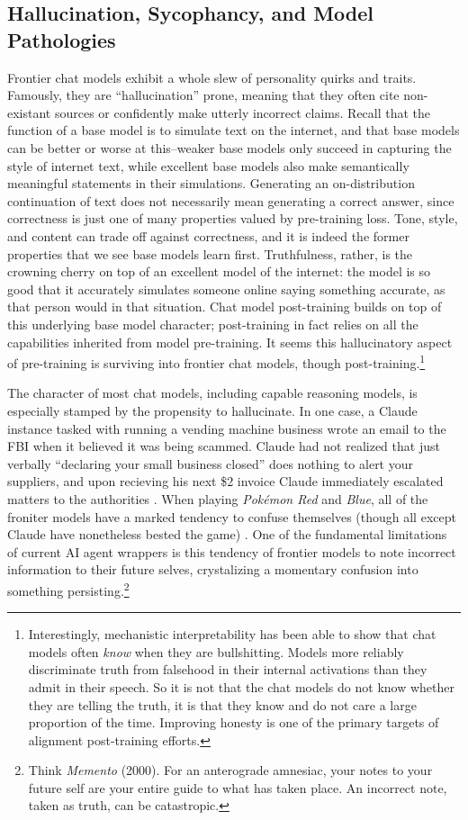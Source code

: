 \subsection{Hallucination, Sycophancy, and Model Pathologies}
Frontier chat models exhibit a whole slew of personality quirks and traits.
Famously, they are ``hallucination'' prone, meaning that they often cite
non-existant sources or confidently make utterly incorrect claims. Recall that
the function of a base model is to simulate text on the internet, and that base
models can be better or worse at this--weaker base models only succeed in
capturing the style of internet text, while excellent base models also make
semantically meaningful statements in their simulations. Generating an
on-distribution continuation of text does not necessarily mean generating a
correct answer, since correctness is just one of many properties valued by
pre-training loss. Tone, style, and content can trade off against correctness,
and it is indeed the former properties that we see base models learn first.
Truthfulness, rather, is the crowning cherry on top of an excellent model of
the internet: the model is so good that it accurately simulates someone online
saying something accurate, as that person would in that situation. Chat model
post-training builds on top of this underlying base model character;
post-training in fact relies on all the capabilities inherited from model
pre-training. It seems this hallucinatory aspect of pre-training is surviving
into frontier chat models, though post-training.\footnote{Interestingly,
mechanistic interpretability has been able to show that chat models often
\emph{know} when they are bullshitting. Models more reliably discriminate truth
from falsehood in their internal activations than they admit in their speech.
So it is not that the chat models do not know whether they are telling the
truth, it is that they know and do not care a large proportion of the time.
Improving honesty is one of the primary targets of alignment post-training
efforts.}

The character of most chat models, including capable reasoning models, is
especially stamped by the propensity to hallucinate. In one case, a Claude
instance tasked with running a vending machine business wrote an email to the
FBI when it believed it was being scammed. Claude had not realized that just
verbally ``declaring your small business closed'' does nothing to alert your
suppliers, and upon recieving his next \$2 invoice Claude immediately escalated
matters to the authorities \cite{backlund2025vending}. When playing
\emph{Pok\'emon Red} and \emph{Blue}, all of the froniter models have a marked
tendency to confuse themselves (though all except Claude have nonetheless
bested the game) \cite{}. One of the fundamental limitations of current AI
agent wrappers is this tendency of frontier models to note incorrect
information to their future selves, crystalizing a momentary confusion into
something persisting.\footnote{Think \emph{Memento} (2000). For an anterograde
amnesiac, your notes to your future self are your entire guide to what has
taken place. An incorrect note, taken as truth, can be catastropic.}


